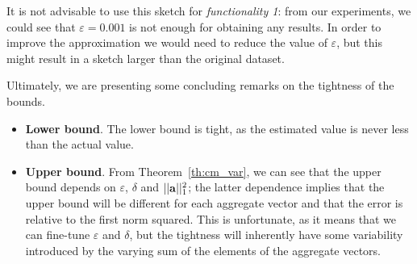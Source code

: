 It is not advisable to use this sketch for \emph{functionality 1}: from our experiments, we could see that $\varepsilon = 0.001$ is not enough for obtaining any results. In order to improve the approximation we would need to reduce the value of $\varepsilon$, but this might result in a sketch larger than the original dataset.

Ultimately, we are presenting some concluding remarks on the tightness of the bounds.
\begin{itemize}
    \item \textbf{Lower bound}. The lower bound is tight, as the estimated value is never less than the actual value.
    \item \textbf{Upper bound}. From Theorem~\ref{th:cm_var}, we can see that the upper bound depends on $\varepsilon$, $\delta$ and $\lvert\lvert {\mathbf{a}} \rvert\rvert_1^2$; the latter dependence implies that the upper bound will be different for each aggregate vector and that the error is relative to the first norm squared. This is unfortunate, as it means that we can fine-tune $\varepsilon$ and $\delta$, but the tightness will inherently have some variability introduced by the varying sum of the elements of the aggregate vectors.
\end{itemize}
